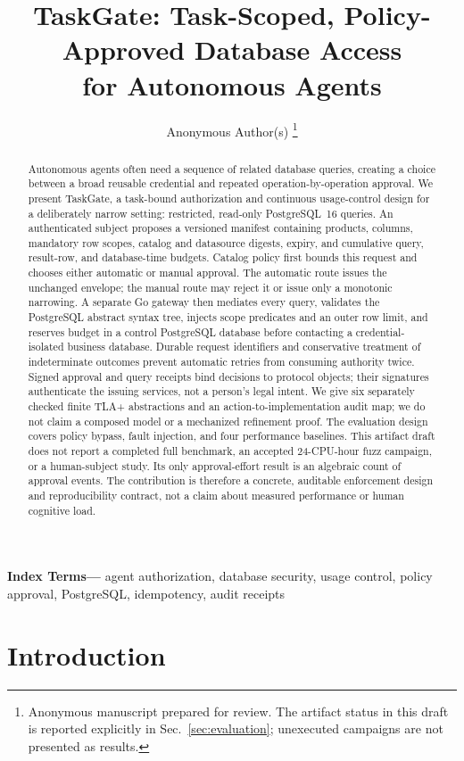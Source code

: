 \documentclass[10pt,journal,compsoc]{IEEEtran}
\title{TaskGate: Task-Scoped, Policy-Approved Database Access\\
for Autonomous Agents}
\author{Anonymous Author(s)%
\thanks{Anonymous manuscript prepared for review. The artifact status in this
draft is reported explicitly in Sec.~\ref{sec:evaluation}; unexecuted campaigns
are not presented as results.}}
\date{}
\newenvironment{IEEEkeywords}{\par\small\noindent\textbf{Index Terms---}}{\par}
\newcommand{\system}{TaskGate\xspace}
\newcommand{\code}[1]{\texttt{\detokenize{#1}}}
\begin{document}
\maketitle

\begin{abstract}
Autonomous agents often need a sequence of related database queries, creating a
choice between a broad reusable credential and repeated operation-by-operation
approval.  We
present \system, a task-bound authorization and continuous usage-control design
for a deliberately narrow setting: restricted, read-only PostgreSQL~16
\code{SELECT} queries.  An authenticated subject proposes a versioned manifest
containing products, columns, mandatory row scopes, catalog and datasource
digests, expiry, and cumulative query, result-row, and database-time budgets.
Catalog policy first bounds this request and chooses either automatic or manual
approval.  The automatic route issues the unchanged envelope; the manual route
may reject it or issue only a monotonic narrowing.  A separate Go
gateway then mediates every query, validates the PostgreSQL abstract syntax
tree, injects scope predicates and an outer row limit, and reserves budget in a
control PostgreSQL database before contacting a credential-isolated business
database.  Durable request identifiers and conservative treatment of
indeterminate outcomes prevent automatic retries from consuming authority
twice.  Signed approval and query receipts bind decisions to protocol objects;
their signatures authenticate the issuing services, not a person's legal
intent.  We give six separately checked finite TLA+ abstractions and an
action-to-implementation audit map; we do not claim a composed model or a
mechanized refinement proof.  The evaluation design covers policy bypass, fault
injection, and four performance baselines.  This artifact draft does not
report a completed full benchmark, an accepted 24-CPU-hour fuzz campaign, or a
human-subject study.
Its only approval-effort result is an algebraic count of approval events.  The
contribution is therefore a concrete, auditable enforcement design and
reproducibility contract, not a claim about measured performance or human
cognitive load.
\end{abstract}

\begin{IEEEkeywords}
agent authorization, database security, usage control, policy approval,
PostgreSQL, idempotency, audit receipts
\end{IEEEkeywords}

\section{Introduction}
\label{sec:introduction}
\end{document}
